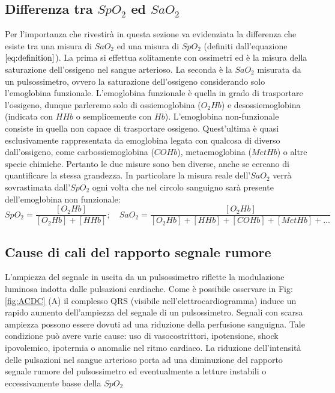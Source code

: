 \documentclass[12pt,a4paper, twoside, openright]{report}
\begin{document}
\subsection{Differenza tra \texorpdfstring{$SpO_2$}{SpO_2} ed \texorpdfstring{$SaO_2$}{SaO_2}}

Per l'importanza che rivestirà in questa sezione va evidenziata la differenza che esiste tra una misura di $SaO_2$ ed una misura di $SpO_2$ (definiti dall'equazione $\ref{eq:definition}$).
La prima si effettua solitamente con ossimetri ed è la misura della saturazione dell'ossigeno nel sangue arterioso.
La seconda è la $SaO_2$ misurata da un pulsossimetro, ovvero la saturazione dell'ossigeno considerando solo l'emoglobina funzionale.
L'emoglobina funzionale è quella in grado di trasportare l'ossigeno, dunque parleremo solo di ossiemoglobina ($O_2Hb$) e desossiemoglobina (indicata con $HHb$ o semplicemente con $Hb$).
L'emoglobina non-funzionale consiste in quella non capace di trasportare ossigeno.
Quest'ultima è quasi esclusivamente rappresentata da emoglobina legata con qualcosa di diverso dall'ossigeno, come carbossiemoglobina ($COHb$), metaemoglobina ($MetHb$) o altre specie chimiche.
Pertanto le due misure sono ben diverse, anche se cercano di quantificare la stessa grandezza.
In particolare la misura reale dell'$SaO_2$ verrà sovrastimata dall'$SpO_2$ ogni volta che nel circolo sanguigno sarà presente dell'emoglobina non funzionale:
\begin{equation}
	\label{eq:definition}
	SpO_2 = \frac{[O_2Hb]}{[O_2Hb]+[HHb]}; \quad SaO_2 = \frac{[O_2Hb]}{[O_2Hb]+[HHb]+			[COHb]+[MetHb]+\ldots}
\end{equation}


\subsection{Cause di cali del rapporto segnale rumore}

L'ampiezza del segnale in uscita da un pulsossimetro riflette la modulazione luminosa indotta dalle pulsazioni cardiache. 
Come è possibile osservare in Fig:\ref{fig:ACDC} (A) il complesso QRS (visibile nell'elettrocardiogramma) induce un rapido aumento dell'ampiezza del segnale di un pulsossimetro. 
Segnali con scarsa ampiezza possono essere dovuti ad una riduzione della perfusione sanguigna. Tale condizione può avere varie cause: uso di vasocostrittori, ipotensione, shock ipovolemico, ipotermia o anomalie nel ritmo cardiaco. 
La riduzione dell'intensità delle pulsazioni nel sangue arterioso porta ad una diminuzione del rapporto segnale rumore del pulsossimetro ed eventualmente a letture instabili o eccessivamente basse della $SpO_2$
\end{document}
